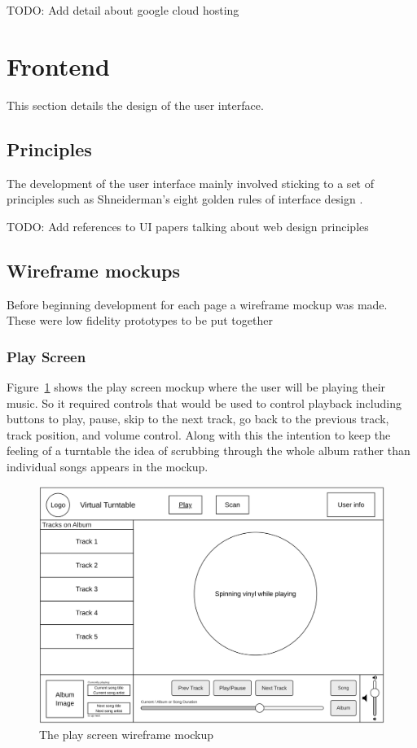 TODO: Add detail about google cloud hosting















\section{Frontend}
This section details the design of the user interface.
\subsection{Principles}
The development of the user interface mainly involved sticking to a set of principles such as Shneiderman's eight golden rules of interface design \cite{Shneiderman}.

TODO: Add references to UI papers talking about web design principles
\subsection{Wireframe mockups}
Before beginning development for each page a wireframe mockup was made. These were low fidelity prototypes to be put together

\subsubsection{Play Screen}
Figure~\ref{fig:play_screen_mockup} shows the play screen mockup where the user will be playing their music. So it required controls that would be used to control playback including buttons to play, pause, skip to the next track, go back to the previous track, track position, and volume control. Along with this the intention to keep the feeling of a turntable the idea of scrubbing through the whole album rather than individual songs appears in the mockup.
\begin{figure} [H]
    \centering
    \includegraphics[width=0.6\linewidth]{figures/play_screen_mockup.png}
    \caption{The play screen wireframe mockup}
    \label{fig:play_screen_mockup}
\end{figure}

